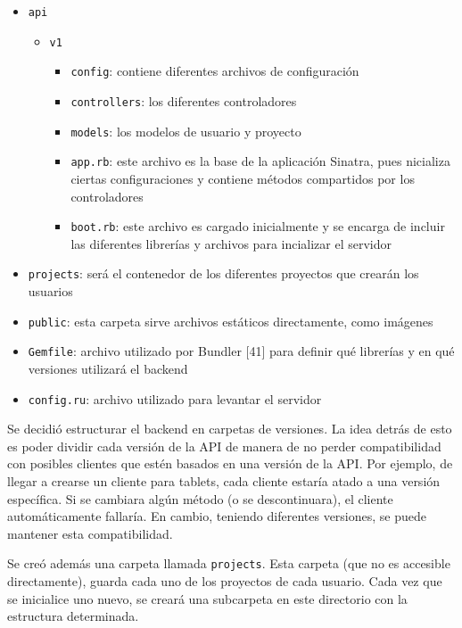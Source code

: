 \documentclass[12pt,spanish,letter]{report}
\begin{document}
\begin{itemize}
\item
  \texttt{api}

  \begin{itemize}
  \item
    \texttt{v1}

    \begin{itemize}
    \item
      \texttt{config}: contiene diferentes archivos de configuración
    \item
      \texttt{controllers}: los diferentes controladores
    \item
      \texttt{models}: los modelos de usuario y proyecto
    \item
      \texttt{app.rb}: este archivo es la base de la aplicación Sinatra,
      pues nicializa ciertas configuraciones y contiene métodos
      compartidos por los controladores
    \item
      \texttt{boot.rb}: este archivo es cargado inicialmente y se
      encarga de incluir las diferentes librerías y archivos para
      incializar el servidor
    \end{itemize}
  \end{itemize}
\item
  \texttt{projects}: será el contenedor de los diferentes proyectos que
  crearán los usuarios
\item
  \texttt{public}: esta carpeta sirve archivos estáticos directamente,
  como imágenes
\item
  \texttt{Gemfile}: archivo utilizado por Bundler {[}41{]} para definir
  qué librerías y en qué versiones utilizará el backend
\item
  \texttt{config.ru}: archivo utilizado para levantar el servidor
\end{itemize}

Se decidió estructurar el backend en carpetas de versiones. La idea
detrás de esto es poder dividir cada versión de la API de manera de no
perder compatibilidad con posibles clientes que estén basados en una
versión de la API. Por ejemplo, de llegar a crearse un cliente para
tablets, cada cliente estaría atado a una versión específica. Si se
cambiara algún método (o se descontinuara), el cliente automáticamente
fallaría. En cambio, teniendo diferentes versiones, se puede mantener
esta compatibilidad.

Se creó además una carpeta llamada \texttt{projects}. Esta carpeta (que
no es accesible directamente), guarda cada uno de los proyectos de cada
usuario. Cada vez que se inicialice uno nuevo, se creará una subcarpeta
en este directorio con la estructura determinada.
\end{document}
